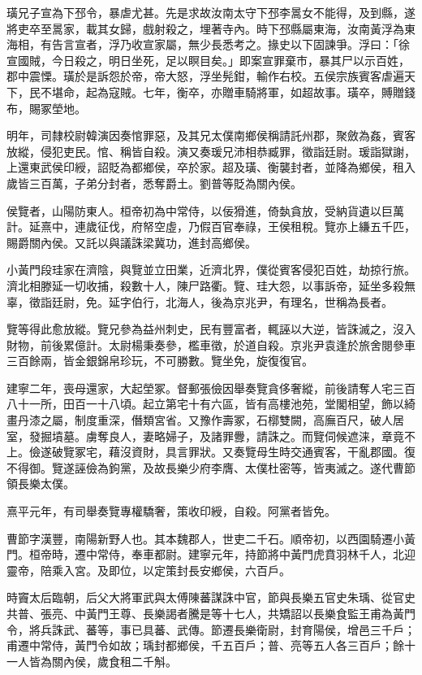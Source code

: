 \begin{pinyinscope}
璜兄子宣為下邳令，暴虐尤甚。先是求故汝南太守下邳李暠女不能得，及到縣，遂將吏卒至暠家，載其女歸，戲射殺之，埋著寺內。時下邳縣屬東海，汝南黃浮為東海相，有告言宣者，浮乃收宣家屬，無少長悉考之。掾史以下固諫爭。浮曰：「徐宣國賊，今日殺之，明日坐死，足以瞑目矣。」即案宣罪棄市，暴其尸以示百姓，郡中震慄。璜於是訴怨於帝，帝大怒，浮坐髡鉗，輸作右校。五侯宗族賓客虐遍天下，民不堪命，起為寇賊。七年，衡卒，亦贈車騎將軍，如超故事。璜卒，賻贈錢布，賜冢塋地。

明年，司隸校尉韓演因奏悺罪惡，及其兄太僕南鄉侯稱請託州郡，聚斂為姦，賓客放縱，侵犯吏民。悺、稱皆自殺。演又奏瑗兄沛相恭臧罪，徵詣廷尉。瑗詣獄謝，上還東武侯印綬，詔貶為都鄉侯，卒於家。超及璜、衡襲封者，並降為鄉侯，租入歲皆三百萬，子弟分封者，悉奪爵土。劉普等貶為關內侯。

侯覽者，山陽防東人。桓帝初為中常侍，以佞猾進，倚埶貪放，受納貨遺以巨萬計。延熹中，連歲征伐，府帑空虛，乃假百官奉祿，王侯租稅。覽亦上縑五千匹，賜爵關內侯。又託以與議誅梁冀功，進封高鄉侯。

小黃門段珪家在濟陰，與覽並立田業，近濟北界，僕從賓客侵犯百姓，劫掠行旅。濟北相滕延一切收捕，殺數十人，陳尸路衢。覽、珪大怨，以事訴帝，延坐多殺無辜，徵詣廷尉，免。延字伯行，北海人，後為京兆尹，有理名，世稱為長者。

覽等得此愈放縱。覽兄參為益州刺史，民有豐富者，輒誣以大逆，皆誅滅之，沒入財物，前後累億計。太尉楊秉奏參，檻車徵，於道自殺。京兆尹袁逢於旅舍閱參車三百餘兩，皆金銀錦帛珍玩，不可勝數。覽坐免，旋復復官。

建寧二年，喪母還家，大起塋冢。督郵張儉因舉奏覽貪侈奢縱，前後請奪人宅三百八十一所，田百一十八頃。起立第宅十有六區，皆有高樓池苑，堂閣相望，飾以綺畫丹漆之屬，制度重深，僭類宮省。又豫作壽冢，石槨雙闕，高廡百尺，破人居室，發掘墳墓。虜奪良人，妻略婦子，及諸罪釁，請誅之。而覽伺候遮涞，章竟不上。儉遂破覽冢宅，藉沒資財，具言罪狀。又奏覽母生時交通賓客，干亂郡國。復不得御。覽遂誣儉為鉤黨，及故長樂少府李膺、太僕杜密等，皆夷滅之。遂代曹節領長樂太僕。

熹平元年，有司舉奏覽專權驕奢，策收印綬，自殺。阿黨者皆免。

曹節字漢豐，南陽新野人也。其本魏郡人，世吏二千石。順帝初，以西園騎遷小黃門。桓帝時，遷中常侍，奉車都尉。建寧元年，持節將中黃門虎賁羽林千人，北迎靈帝，陪乘入宮。及即位，以定策封長安鄉侯，六百戶。

時竇太后臨朝，后父大將軍武與太傅陳蕃謀誅中官，節與長樂五官史朱瑀、從官史共普、張亮、中黃門王尊、長樂謁者騰是等十七人，共矯詔以長樂食監王甫為黃門令，將兵誅武、蕃等，事已具蕃、武傳。節遷長樂衛尉，封育陽侯，增邑三千戶；甫遷中常侍，黃門令如故；瑀封都鄉侯，千五百戶；普、亮等五人各三百戶；餘十一人皆為關內侯，歲食租二千斛。


\end{pinyinscope}
